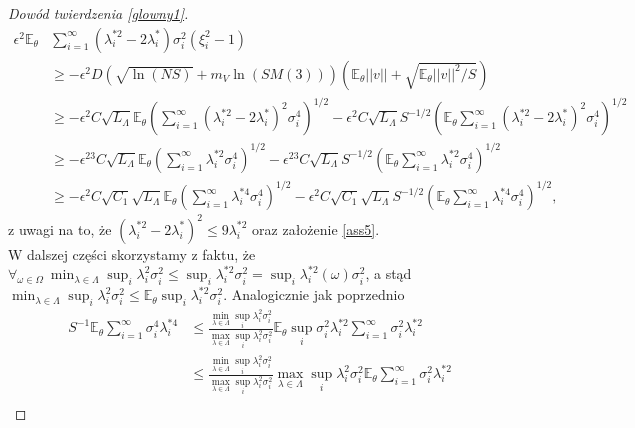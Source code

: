 \documentclass[man,mfiu]{mgrwms}
\begin{document}
\begin{proof}[Dowód twierdzenia \ref{glowny1}]
\begin{displaymath}
\begin{split}
\epsilon^2\mathbb{E}_{\theta}&\sum_{i=1}^{\infty}(\lambda_i^{*2}-2\lambda_i^*)\sigma_i^2(\xi_i^2-1)\\
&\geq  -\epsilon^2D\left(\sqrt{\ln (NS)}+m_V\ln (SM(3))\right)\left(\mathbb{E}_{\theta}||v||+\sqrt{\mathbb{E}_{\theta}||v||^2/S}\right)\\
&\geq -\epsilon^2C\sqrt{L_{\Lambda}}\mathbb{E}_{\theta}\left(\sum_{i=1}^{\infty}(\lambda_i^{*2}-2\lambda_i^*)^2\sigma_i^4\right)^{1/2}-\epsilon^2C\sqrt{L_{\Lambda}}S^{-1/2}\left(\mathbb{E}_{\theta}\sum_{i=1}^{\infty}(\lambda_i^{*2}-2\lambda_i^*)^2\sigma_i^4\right)^{1/2}\\
&\geq -\epsilon^23C\sqrt{L_{\Lambda}}\mathbb{E}_{\theta}\left(\sum_{i=1}^{\infty}\lambda_i^{*2}\sigma_i^4\right)^{1/2}-\epsilon^23C\sqrt{L_{\Lambda}}S^{-1/2}\left(\mathbb{E}_{\theta}\sum_{i=1}^{\infty}\lambda_i^{*2}\sigma_i^4\right)^{1/2}\\
&\geq -\epsilon^2C\sqrt{C_1}\sqrt{L_{\Lambda}}\mathbb{E}_{\theta}\left(\sum_{i=1}^{\infty}\lambda_i^{*4}\sigma_i^4\right)^{1/2}-\epsilon^2C\sqrt{C_1}\sqrt{L_{\Lambda}}S^{-1/2}\left(\mathbb{E}_{\theta}\sum_{i=1}^{\infty}\lambda_i^{*4}\sigma_i^4\right)^{1/2},
\end{split}
\end{displaymath}
z uwagi na to, że $(\lambda_i^{*2}-2\lambda_i^*)^2\leq 9\lambda_i^{*2}$ oraz założenie \ref{ass5}.\\
\indent W dalszej części skorzystamy z faktu, że $\forall_{\omega\in \Omega}\ \min_{\lambda\in \Lambda}\sup_i \lambda_i^2\sigma_i^2\leq \sup_i\lambda_i^{*2}\sigma_i^2=\sup_i\lambda_i^{*2}(\omega)\sigma_i^2$, a stąd $\min_{\lambda\in \Lambda}\sup_i \lambda_i^2\sigma_i^2\leq \mathbb{E}_{\theta}\sup_i\lambda_i^{*2}\sigma_i^2$. Analogicznie jak poprzednio
\begin{displaymath}
\begin{split}
S^{-1}\mathbb{E}_{\theta}\sum_{i=1}^{\infty}\sigma_i^4\lambda_i^{*4}&\leq \frac{\min_{\lambda\in \Lambda}\sup_i \lambda_i^2\sigma_i^2}{\max_{\lambda\in \Lambda}\sup_i \lambda_i^2\sigma_i^2}\mathbb{E}_{\theta}\sup_i\sigma_i^2\lambda_i^{*2}\sum_{i=1}^{\infty}\sigma_i^2\lambda_i^{*2}\\
&\leq \frac{\min_{\lambda\in \Lambda}\sup_i \lambda_i^2\sigma_i^2}{\max_{\lambda\in \Lambda}\sup_i \lambda_i^2\sigma_i^2}\max_{\lambda\in \Lambda}\sup_i \lambda_i^2\sigma_i^2\mathbb{E}_{\theta}\sum_{i=1}^{\infty}\sigma_i^2\lambda_i^{*2}\\

\end{split}
\end{displaymath}
\end{proof}
\end{document}
